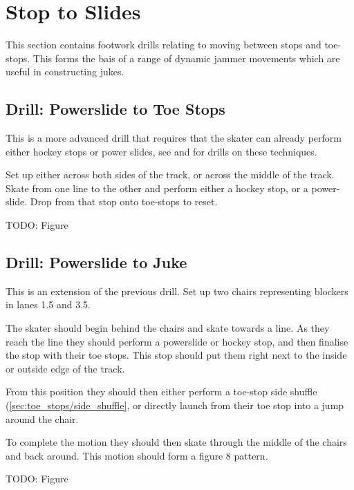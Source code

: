 \section{Stop to Slides}
\label{sec:footwork/stop_to_slide}

This section contains footwork drills relating to moving between stops and toe-stops.
This forms the bais of a range of dynamic jammer movements which are useful in constructing jukes.


\subsection*{Drill: Powerslide to Toe Stops} 
\label{drill:toe_stops/slides/powerslide}

This is a more advanced drill that requires that the skater can already perform either hockey stops or power slides, see  and  for drills on these techniques. 

Set up either across both sides of the track, or across the middle of the track. 
Skate from one line to the other and perform either a hockey stop, or a power-slide.
Drop from that stop onto toe-stops to reset.

{\color{red} TODO: Figure}

\subsection*{Drill: Powerslide to Juke} 
\label{drill:toe_stops/slides/powerslide_juke}

This is an extension of the previous drill.
Set up two chairs representing blockers in lanes 1.5 and 3.5. 

The skater should begin behind the chairs and skate towards a line.   
As they reach the line they should perform a powerslide or hockey stop, and then finalise the stop with their toe stops.
This stop should put them right next to the inside or outside edge of the track.

From this position they should then either perform a toe-stop side shuffle (\cref{sec:toe_stops/side_shuffle}, or directly launch from their toe stop into a jump around the chair.  

To complete the motion they should then skate through the middle of the chairs and back around.
This motion should form a figure 8 pattern.

{\color{red} TODO: Figure}
